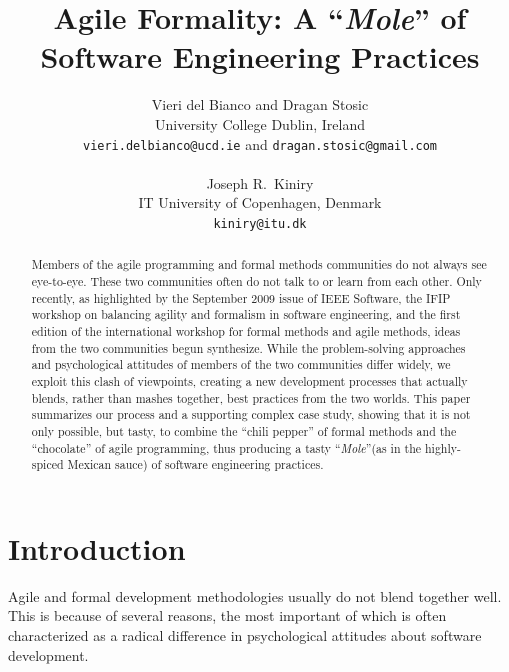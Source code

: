 \documentclass[english]{lni}
\newcommand{\mole}{``\emph{Mole}''\xspace}
\begin{document}
\title{Agile Formality: A \mole of\\Software Engineering Practices}

\author{Vieri del Bianco and Dragan Stosic\\
  University College Dublin, Ireland\\
  \texttt{vieri.delbianco@ucd.ie} and \texttt{dragan.stosic@gmail.com}\\
  \\
  Joseph R.~Kiniry \\
  IT University of Copenhagen, Denmark\\
  \texttt{kiniry@itu.dk}
}

\maketitle

\begin{abstract}

  Members of the agile programming and formal methods communities do
  not always see eye-to-eye.  These two communities often do not talk
  to or learn from each other.  Only recently, as highlighted by the
  September 2009 issue of IEEE Software, the IFIP workshop on
  balancing agility and formalism in software engineering, and the
  first edition of the international workshop for formal methods and
  agile methods, ideas from the two communities begun synthesize.
  While the problem-solving approaches and psychological attitudes of
  members of the two communities differ widely, we exploit this clash
  of viewpoints, creating a new development processes that actually
  blends, rather than mashes together, best practices from the two
  worlds.  This paper summarizes our process and a supporting complex
  case study, showing that it is not only possible, but tasty, to
  combine the ``chili pepper'' of formal methods and the ``chocolate''
  of agile programming, thus producing a tasty \mole (as in the
  highly-spiced Mexican sauce) of software engineering practices.

\end{abstract}

\section{Introduction}
\label{sec:introduction}

Agile and formal development methodologies usually do not blend
together well.  This is because of several reasons, the most important
of which is often characterized as a radical difference in
psychological attitudes about software development.
\end{document}
